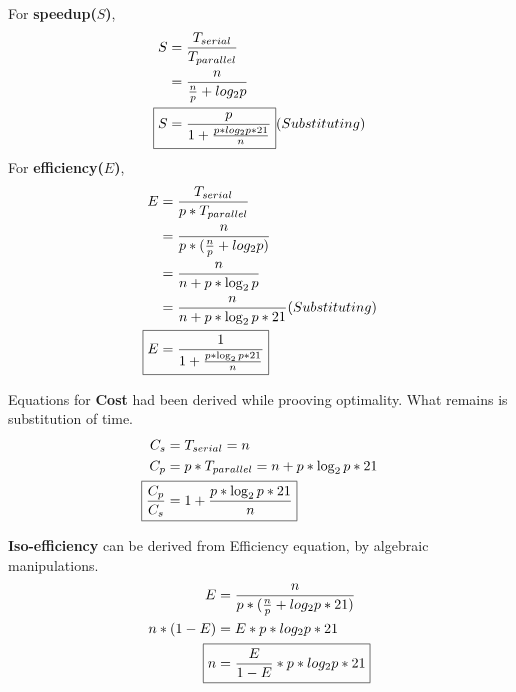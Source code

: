 \documentclass{article}
\newcommand{\bld}[1]{\textbf{#1}}
\begin{document}
For \bld{speedup($S$)},
\begin{align*}
S &=\frac{T_{serial}}{T_{parallel}}\\
  &= \frac{n}{\frac{n}{p}+log_2 p}\\
\Aboxed{S &= \frac{p}{1+\frac{p*log_2 p*21}{n}}} (Substituting)
\end{align*}
For \bld{efficiency($E$)},
\begin{align*}
E &= \frac{T_{serial}}{p*T_{parallel}}\\
  &= \frac{n}{p*(\frac{n}{p}+log_2 p)}\\
  &= \frac{n}{n+p*\log_2 p}\\
  &= \frac{n}{n+p*\log_2 p*21}(Substituting)\\
\Aboxed{E &= \frac{1}{1+\frac{p*\log_2 p*21}{n}}}
\end{align*}

Equations for \bld{Cost} had been derived while prooving optimality. What remains is substitution of time.
\begin{align*}
C_{s} &=T_{serial}=n\\
C_{p} &=p*T_{parallel}=n+p*\log_2 p*21\\
\Aboxed{\frac{C_{p}}{C_{s}} &=1+\frac{p*\log_2 p*21}{n}}
\end{align*}

\bld{Iso-efficiency} can be derived from Efficiency equation, by algebraic manipulations.
\begin{align*}
E &= \frac{n}{p*(\frac{n}{p}+log_2 p*21)}\\
n*(1-E) &= E*p*log_2 p*21\\
\Aboxed{n &= \frac{E}{1-E}*p*log_2 p*21}\\
\end{align*}
\end{document}
